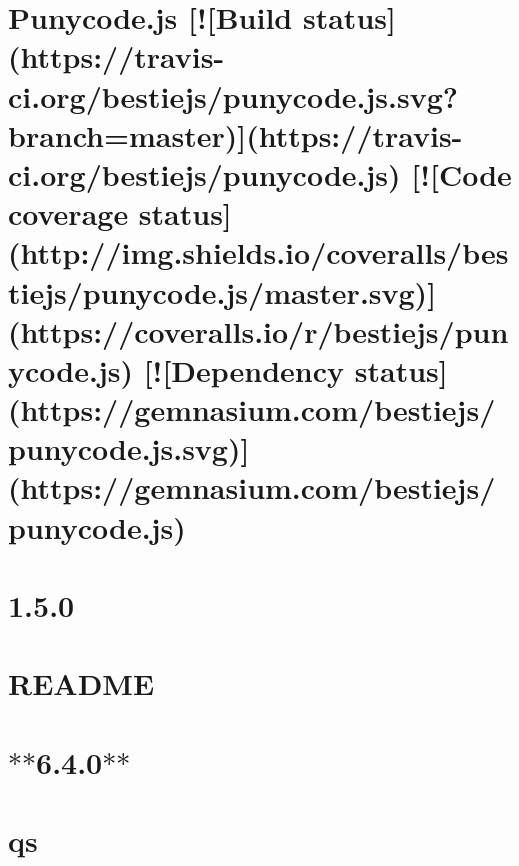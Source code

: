 \documentclass[twoside]{book}
\newcommand{\+}{\discretionary{\mbox{\scriptsize$\hookleftarrow$}}{}{}}
\begin{document}
\chapter{Punycode.\+js \mbox{[}!\mbox{[}Build status\mbox{]}(https\+://travis-\/ci.org/bestiejs/punycode.js.\+svg?branch=master)\mbox{]}(https\+://travis-\/ci.org/bestiejs/punycode.js) \mbox{[}!\mbox{[}Code coverage status\mbox{]}(http\+://img.shields.\+io/coveralls/bestiejs/punycode.js/master.svg)\mbox{]}(https\+://coveralls.io/r/bestiejs/punycode.js) \mbox{[}!\mbox{[}Dependency status\mbox{]}(https\+://gemnasium.com/bestiejs/punycode.js.\+svg)\mbox{]}(https\+://gemnasium.com/bestiejs/punycode.js)}
\label{md__c_1_workspace_demo_src_main_script_node_modules_punycode__r_e_a_d_m_e}

\chapter{1.5.0}
\label{md__c_1_workspace_demo_src_main_script_node_modules_q__c_h_a_n_g_e_s}

\chapter{R\+E\+A\+D\+ME}
\label{md__c_1_workspace_demo_src_main_script_node_modules_q__r_e_a_d_m_e}

\chapter{$\ast$$\ast$6.4.0$\ast$$\ast$}
\label{md__c_1_workspace_demo_src_main_script_node_modules_qs__c_h_a_n_g_e_l_o_g}

\chapter{qs}
\label{md__c_1_workspace_demo_src_main_script_node_modules_qs__r_e_a_d_m_e}

\end{document}
